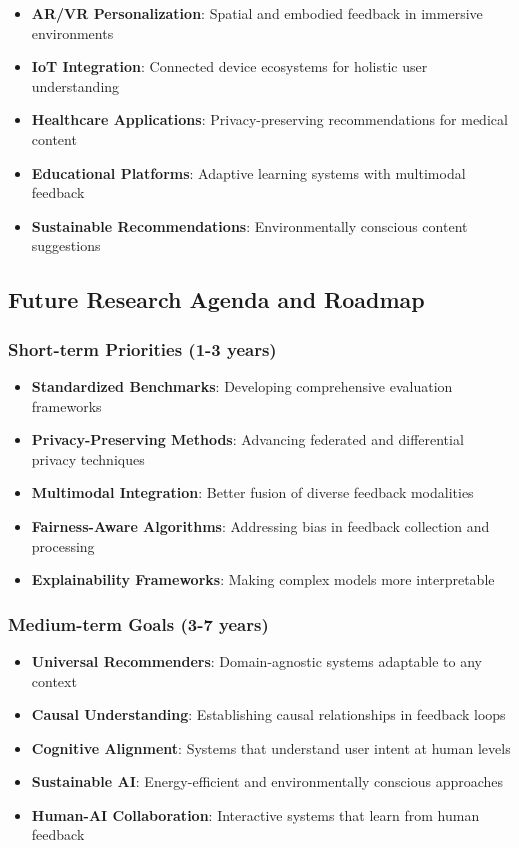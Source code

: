\begin{itemize}
    \item \textbf{AR/VR Personalization}: Spatial and embodied feedback in immersive environments
    \item \textbf{IoT Integration}: Connected device ecosystems for holistic user understanding
    \item \textbf{Healthcare Applications}: Privacy-preserving recommendations for medical content
    \item \textbf{Educational Platforms}: Adaptive learning systems with multimodal feedback
    \item \textbf{Sustainable Recommendations}: Environmentally conscious content suggestions
\end{itemize}

\subsection{Future Research Agenda and Roadmap}

\subsubsection{Short-term Priorities (1-3 years)}

\begin{itemize}
    \item \textbf{Standardized Benchmarks}: Developing comprehensive evaluation frameworks
    \item \textbf{Privacy-Preserving Methods}: Advancing federated and differential privacy techniques
    \item \textbf{Multimodal Integration}: Better fusion of diverse feedback modalities
    \item \textbf{Fairness-Aware Algorithms}: Addressing bias in feedback collection and processing
    \item \textbf{Explainability Frameworks}: Making complex models more interpretable
\end{itemize}

\subsubsection{Medium-term Goals (3-7 years)}

\begin{itemize}
    \item \textbf{Universal Recommenders}: Domain-agnostic systems adaptable to any context
    \item \textbf{Causal Understanding}: Establishing causal relationships in feedback loops
    \item \textbf{Cognitive Alignment}: Systems that understand user intent at human levels
    \item \textbf{Sustainable AI}: Energy-efficient and environmentally conscious approaches
    \item \textbf{Human-AI Collaboration}: Interactive systems that learn from human feedback
\end{itemize}

